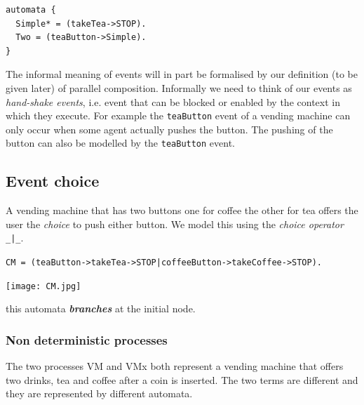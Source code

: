 \documentclass[]{article}
\begin{document}
\noindent\begin{center}
\begin{minipage}{0.45\textwidth}\begin{verbatim}
automata {
  Simple* = (takeTea->STOP).
  Two = (teaButton->Simple).
}\end{verbatim} \end{minipage}
\end{center}

 The informal meaning of events  will  in part be formalised  by our  definition (to be given later) of  parallel composition. Informally we need to think of our events as \emph{hand-shake events}, i.e. event that can be blocked or enabled by the context in which they execute. For example the \verb$teaButton$ event of a vending machine can only occur when some agent actually pushes the button.  The pushing of the button  can also be modelled  by the \verb$teaButton$ event.




\subsection{Event choice}
A vending machine that has two buttons one for coffee the other for tea offers the user the \emph{choice} to push either button. We model this using the \emph{choice operator} \verb$_|_$.



\noindent\begin{center}  \verb$CM = (teaButton->takeTea->STOP|coffeeButton->takeCoffee->STOP).$

\texttt{[image: CM.jpg]}\end{center}

\noindent this automata {\bf \it branches} at the  initial node.

\subsubsection{Non deterministic processes} \label{sec:ndfa}
The two processes {\sf VM}  and {\sf VMx} both represent a vending machine that offers two drinks, {\sf tea} and {\sf coffee} after a coin is inserted. The two  terms are different and they are represented by  different automata.
\end{document}
